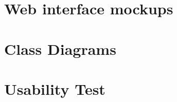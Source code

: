 	\section{Web interface mockups}
		
		\label{app:Mock}
	\section{Class Diagrams}
	\label{app:Class-diagrams}
		
        
   \section{Usability Test}
   	
   		\label{app:quest}



\appendix


